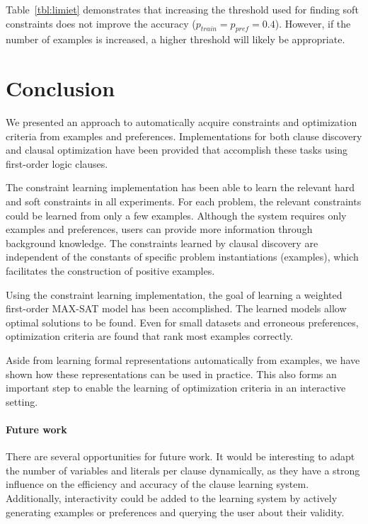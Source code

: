 \documentclass[letterpaper]{article}
\theoremstyle{definition}
\begin{document}
Table~\ref{tbl:limiet} demonstrates that increasing the threshold used for finding soft constraints does not improve the accuracy ($p_{train} = p_{pref} = 0.4$).
However, if the number of examples is increased, a higher threshold will likely be appropriate.


\section{Conclusion}
We presented an approach to automatically acquire constraints and optimization criteria from examples and preferences.
Implementations for both clause discovery and clausal optimization have been provided that accomplish these tasks using first-order logic clauses.

The constraint learning implementation has been able to learn the relevant hard and soft constraints in all experiments.
For each problem, the relevant constraints could be learned from only a few examples.
Although the system requires only examples and preferences, users can provide more information through background knowledge.
The constraints learned by clausal discovery are independent of the constants of specific problem instantiations (examples), which facilitates the construction of positive examples.

Using the constraint learning implementation, the goal of learning a weighted first-order MAX-SAT model has been accomplished.
The learned models allow optimal solutions to be found.
Even for small datasets and erroneous preferences, optimization criteria are found that rank most examples correctly.

Aside from learning formal representations automatically from examples, we have shown how these representations can be used in practice.
This also forms an important step to enable the learning of optimization criteria in an interactive setting.

\paragraph{Future work}
There are several opportunities for future work.
It would be interesting to adapt the number of variables and literals per clause dynamically, as they have a strong influence on the efficiency and accuracy of the clause learning system.
Additionally, interactivity could be added to the learning system by actively generating examples or preferences and querying the user about their validity.
\end{document}
